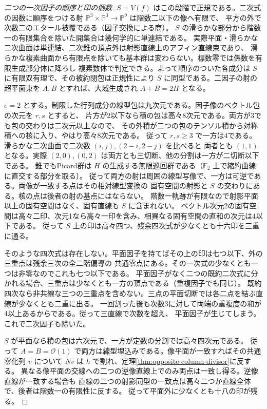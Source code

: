 \begin{proof}[二つの一次因子の順序と印の個数]
$S=V(f)$ はこの段階で正規である。二次式の因数に順序をつける射
$\mathbb P^3\times\mathbb P^3\to\mathbb P^9$ は階数二以下の像へ有限で、
平方の外で次数二のエタール被覆である（因子交換による商）。
$S$ の滑らかな部分から階数一の有限集合を除いた開集合は幾何学的に単連結である。
実際平面・滑らかな二次曲面は単連結、二次錐の頂点外は射影直線上のアフィン直線束であり、
滑らかな複素曲面から有限点を除いても基本群は変わらない。標数零では係数を有限生成部分体に降ろし
複素数体で判定できる。よって順序のついた各成分は $S$ に有限双有理で、その被約閉包は正規性により
$S$ に同型である。二因子の射の超平面束を $A,B$ とすれば、大域生成され $A+B=2H$ となる。

$e=2$ とする。制限した行列成分の線型包は九次元である。因子像のベクトル包の次元を $r,s$ とすると、
片方が2以下なら積の包は高々8次元である。両方が3でも包の交わりは二次元以上なので、
その外積が二つの包のテンソル積から対称積への核に入り、やはり高々8次元である。
従って $r,s\ge3$ で一方は4である。滑らかな二次曲面で二次数 $(i,j),(2-i,2-j)$ を比べると
両者とも $(1,1)$ となる。実際 $(2,0),(0,2)$ は両方とも三切断、他の分割は一方が二切断以下である。
錐でもPicard群は $H$ の生成する無限巡回群である（$\mathbb F_2$ 上で縮約曲線に直交する部分を取る）。
従って両方の射は周囲の線型写像で、一方は可逆である。両像が一致する点はその相対線型変換の
固有空間の射影と $S$ の交わりにある。核の点は後者の射の基点にはならない。
階数一軌跡が有限なので射影平面以上の固有空間はなく、固有直線も $S$ に含まれない。
ベクトル次元2の固有空間は高々二印、次元1なら高々一印を含み、相異なる固有空間の直和の次元は4以下である。
従って $S$ 上の印は高々四つ、残余四次式が少なくとも十六印を三重に通る。

そのような四次式は存在しない。平面因子を持てばその上の印は七つ以下、外の三重点は残余三次の全二階偏導の
共通零点にある。その一次式の少なくとも一つは非零なのでこれも七つ以下である。
平面因子がなく二つの既約二次式に分かれる場合、三重点は少なくとも一方の頂点である（重複因子でも同じ）。
既約四次なら非共線な三つの三重点を含めない。三点の平面切断では各二点を結ぶ直線が少なくとも二重に出る。
一回割った後も次数3に対して両端の重複度の和が4以上あるからである。従って三直線で次数を超え、
平面因子が生じてしまう。これで二次因子も除いた。

$S$ が平面なら積の包は六次元で、一方が定数の分割では高々四次元である。
従って $A=B=\mathcal O(1)$ で両方は線型埋込みである。像平面が一致すればその共通零化列 $v$ について
$Nv$ は $h$ で割れ、定理\ref{thm:opposite-column-divisor}に反する。
異なる像平面の交線への二つの逆像直線上でのみ両点は一致し得る。逆像直線が一致する場合も
直線の二つの射影同型の一致点は高々二つか直線全体で、後者は階数一の有限性に反する。
従って平面外に少なくとも十八の印が残る。
\end{proof}
